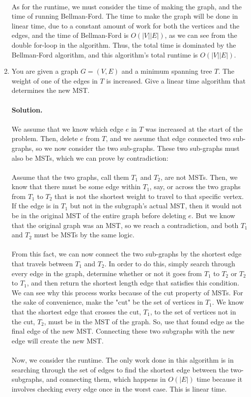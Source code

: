 \documentclass[11pt]{article}
\newcommand\solution{%
  \textbf{Solution.}\\%
}
\begin{document}
\begin{enumerate}
\\
As for the runtime, we must consider the time of making the graph, and the time of running Bellman-Ford. The time to make the graph will be done in linear time, due to a constant amount of work for both the vertices and the edges, and the time of Bellman-Ford is $O(|V||E|)$, as we can see from the double for-loop in the algorithm. Thus, the total time is dominated by the Bellman-Ford algorithm, and this algorithm's total runtime is $O(|V||E|)$. 

\item
You are given a graph $G = (V, E)$ and a minimum spanning tree $T $. The weight of one of the edges in $T $ is increased. Give a linear time algorithm that determines the new MST. \\\\
\solution \\
We assume that we know which edge $e$ in $T$ was increased at the start of the problem. Then, delete $e$ from $T$, and we assume that edge connected two sub-graphs, so we now consider the two sub-graphs. These two sub-graphs must also be MSTs, which we can prove by contradiction: \\
\\
Assume that the two graphs, call them $T_1$ and $T_2$, are not MSTs. Then, we know that there must be some edge within $T_1$, say, or across the two graphs from $T_1$ to $T_2$ that is not the shortest weight to travel to that specific vertex. If the edge is in $T_1$ but not in the subgraph's actual MST, then it would not be in the original MST of the entire graph before deleting $e$. But we know that the original graph was an MST, so we reach a contradiction, and both $T_1$ and $T_2$ must be MSTs by the same logic. \\
\\
From this fact, we can now connect the two sub-graphs by the shortest edge that travels between $T_1$ and $T_2$. In order to do this, simply search through every edge in the graph, determine whether or not it goes from $T_1$ to $T_2$ or $T_2$ to $T_1$, and then return the shortest length edge that satisfies this condition. We can see why this process works because of the cut property of MSTs. For the sake of convenience, make the "cut" be the set of vertices in $T_1$. We know that the shortest edge that crosses the cut, $T_1$, to the set of vertices not in the cut, $T_2$, must be in the MST of the graph. So, use that found edge as the final edge of the new MST. Connecting these two subgraphs with the new edge will create the new MST.  \\
\\
Now, we consider the runtime. The only work done in this algorithm is in searching through the set of edges to find the shortest edge between the two-subgraphs, and connecting them, which happens in $O(|E|)$ time because it involves checking every edge once in the worst case. This is linear time. 


\end{enumerate}
\end{document}
